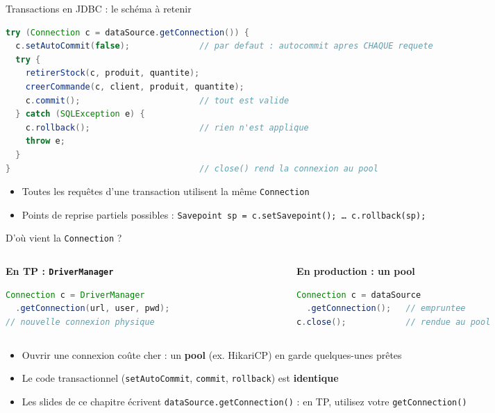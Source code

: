 \documentclass[aspectratio=169,10pt]{beamer}
\begin{document}
\begin{frame}[fragile]{Transactions en JDBC : le sch\'ema \`a retenir}
\begin{lstlisting}[language=Java]
try (Connection c = dataSource.getConnection()) {
  c.setAutoCommit(false);              // par defaut : autocommit apres CHAQUE requete
  try {
    retirerStock(c, produit, quantite);
    creerCommande(c, client, produit, quantite);
    c.commit();                        // tout est valide
  } catch (SQLException e) {
    c.rollback();                      // rien n'est applique
    throw e;
  }
}                                      // close() rend la connexion au pool
\end{lstlisting}
  \begin{itemize}
    \item Toutes les requ\^etes d'une transaction utilisent la \alert{m\^eme} \texttt{Connection}
    \item Points de reprise partiels possibles : \texttt{Savepoint sp = c.setSavepoint(); \ldots{} c.rollback(sp);}
  \end{itemize}
\end{frame}

\begin{frame}[fragile]{D'o\`u vient la \texttt{Connection} ?}
  \begin{columns}[T]
    \begin{column}{0.48\textwidth}
      \textbf{En TP : \texttt{DriverManager}}
\begin{lstlisting}[language=Java]
Connection c = DriverManager
  .getConnection(url, user, pwd);
// nouvelle connexion physique
\end{lstlisting}
    \end{column}
    \begin{column}{0.48\textwidth}
      \textbf{En production : un pool}
\begin{lstlisting}[language=Java]
Connection c = dataSource
  .getConnection();   // empruntee
c.close();            // rendue au pool
\end{lstlisting}
    \end{column}
  \end{columns}
  \vspace{2mm}
  \begin{itemize}
    \item Ouvrir une connexion co\^ute cher : un \textbf{pool} (ex. HikariCP) en garde quelques-unes pr\^etes
    \item Le code transactionnel (\texttt{setAutoCommit}, \texttt{commit}, \texttt{rollback}) est \textbf{identique}
    \item Les slides de ce chapitre \'ecrivent \texttt{dataSource.getConnection()} : en TP, utilisez votre \texttt{getConnection()}
  \end{itemize}
\end{frame}
\end{document}
